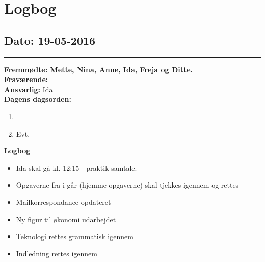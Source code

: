 \chapter{Logbog}
\section{Dato: 19-05-2016}
\hrule
\textbf{Fremmødte: Mette, Nina, Anne, Ida, Freja og Ditte.} \\
\textbf{Fraværende:} \\
\textbf{Ansvarlig:} Ida \\
\textbf{Dagens dagsorden: }
\begin{enumerate}
	\item 
	\item Evt.
\end{enumerate}

\underline{\textbf{Logbog}}
\begin{itemize}
\item Ida skal gå kl. 12:15 - praktik samtale.
\item Opgaverne fra i går (hjemme opgaverne) skal tjekkes igennem og rettes
\item Mailkorrespondance opdateret
\item Ny figur til økonomi udarbejdet
\item Teknologi rettes grammatisk igennem
\item Indledning rettes igennem
\end{itemize}

\newpage